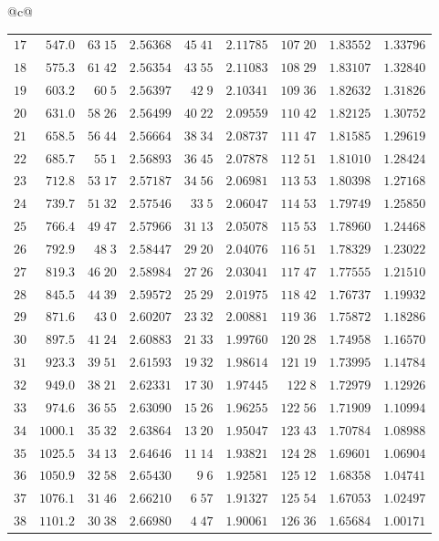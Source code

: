 \begin{center}
{\begin{tabular}{@{}c@{}}
\begin{tabular}{r|r|r|r|r|r|r|r|r}
$17$&$547.0$&$63\;15$&$2.56368$&$45\;41$&$2.11785$&$107\;20$&$1.83552$&$1.33796$\\
$18$&$575.3$&$61\;42$&$2.56354$&$43\;55$&$2.11083$&$108\;29$&$1.83107$&$1.32840$\\
$19$&$603.2$&$60\;5$&$2.56397$&$42\;9$&$2.10341$&$109\;36$&$1.82632$&$1.31826$\\[2pt]
$20$&$631.0$&$58\;26$&$2.56499$&$40\;22$&$2.09559$&$110\;42$&$1.82125$&$1.30752$\\
$21$&$658.5$&$56\;44$&$2.56664$&$38\;34$&$2.08737$&$111\;47$&$1.81585$&$1.29619$\\
$22$&$685.7$&$55\;1$&$2.56893$&$36\;45$&$2.07878$&$112\;51$&$1.81010$&$1.28424$\\
$23$&$712.8$&$53\;17$&$2.57187$&$34\;56$&$2.06981$&$113\;53$&$1.80398$&$1.27168$\\
$24$&$739.7$&$51\;32$&$2.57546$&$33\;5$&$2.06047$&$114\;53$&$1.79749$&$1.25850$\\[2pt]
$25$&$766.4$&$49\;47$&$2.57966$&$31\;13$&$2.05078$&$115\;53$&$1.78960$&$1.24468$\\
$26$&$792.9$&$48\;3$&$2.58447$&$29\;20$&$2.04076$&$116\;51$&$1.78329$&$1.23022$\\
$27$&$819.3$&$46\;20$&$2.58984$&$27\;26$&$2.03041$&$117\;47$&$1.77555$&$1.21510$\\
$28$&$845.5$&$44\;39$&$2.59572$&$25\;29$&$2.01975$&$118\;42$&$1.76737$&$1.19932$\\
$29$&$871.6$&$43\;0$&$2.60207$&$23\;32$&$2.00881$&$119\;36$&$1.75872$&$1.18286$\\[2pt]
$30$&$897.5$&$41\;24$&$2.60883$&$21\;33$&$1.99760$&$120\;28$&$1.74958$&$1.16570$\\
$31$&$923.3$&$39\;51$&$2.61593$&$19\;32$&$1.98614$&$121\;19$&$1.73995$&$1.14784$\\
$32$&$949.0$&$38\;21$&$2.62331$&$17\;30$&$1.97445$&$122\;8$&$1.72979$&$1.12926$\\
$33$&$974.6$&$36\;55$&$2.63090$&$15\;26$&$1.96255$&$122\;56$&$1.71909$&$1.10994$\\
$34$&$1000.1$&$35\;32$&$2.63864$&$13\;20$&$1.95047$&$123\;43$&$1.70784$&$1.08988$\\[2pt]
$35$&$1025.5$&$34\;13$&$2.64646$&$11\;14$&$1.93821$&$124\;28$&$1.69601$&$1.06904$\\
$36$&$1050.9$&$32\;58$&$2.65430$&$9\;6$&$1.92581$&$125\;12$&$1.68358$&$1.04741$\\
$37$&$1076.1$&$31\;46$&$2.66210$&$6\;57$&$1.91327$&$125\;54$&$1.67053$&$1.02497$\\
$38$&$1101.2$&$30\;38$&$2.66980$&$4\;47$&$1.90061$&$126\;36$&$1.65684$&$1.00171$\\

\end{tabular}
\end{tabular}}
\end{center}

